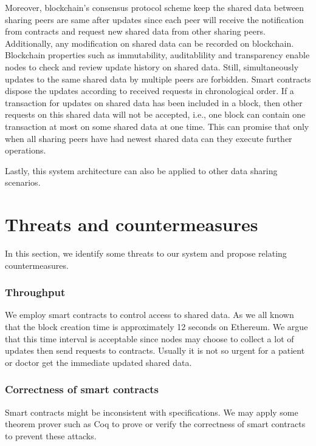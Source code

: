 \documentclass[conference]{IEEEtran}
\begin{document}
Moreover, blockchain's  consensus protocol scheme keep the shared data between sharing peers are same after updates since each peer will receive the notification from contracts and request new shared data from other sharing peers. Additionally, any modification on shared data can be recorded on blockchain. Blockchain properties such as immutability, auditablility and transparency enable nodes to check and review update history on shared data. Still, simultaneously updates to the same shared data by multiple peers are forbidden. Smart contracts dispose the updates according to received requests in chronological order. If a transaction for updates on shared data has been included in a block, then other requests on this shared data will not be accepted, i.e., one block can contain one transaction at most on some shared data at one time. This can promise that only when all sharing peers have had newest shared data can they execute further operations.

Lastly, this system architecture can also be applied to other data sharing scenarios.


\section{Threats and countermeasures}
\label{threats}
 In this section, we identify some threats to our system and propose relating countermeasures.
\subsubsection{Throughput}
We employ smart contracts to control access to shared data. As we all known that the block creation time is approximately 12 seconds on Ethereum. We argue that this time interval is acceptable since nodes may choose to collect a lot of updates then send requests to contracts. Usually it is not so urgent for a patient or doctor get the immediate updated shared data.

\subsubsection{Correctness of smart contracts }
Smart contracts might be inconsistent with specifications. We may apply some theorem prover such as Coq\cite{huet2004coq} to prove or verify the correctness of smart contracts to prevent these attacks.
\end{document}
